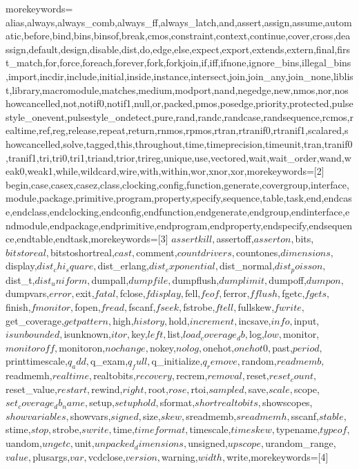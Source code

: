 {morekeywords={%
alias,always,always_comb,always_ff,always_latch,and,assert,assign,assume,automatic,before,bind,bins,binsof,break,cmos,constraint,context,continue,cover,cross,deassign,default,design,disable,dist,do,edge,else,expect,export,extends,extern,final,first_match,for,force,foreach,forever,fork,forkjoin,if,iff,ifnone,ignore_bins,illegal_bins,import,incdir,include,initial,inside,instance,intersect,join,join_any,join_none,liblist,library,macromodule,matches,medium,modport,nand,negedge,new,nmos,nor,noshowcancelled,not,notif0,notif1,null,or,packed,pmos,posedge,priority,protected,pulsestyle_onevent,pulsestyle_ondetect,pure,rand,randc,randcase,randsequence,rcmos,realtime,ref,reg,release,repeat,return,rnmos,rpmos,rtran,rtranif0,rtranif1,scalared,showcancelled,solve,tagged,this,throughout,time,timeprecision,timeunit,tran,tranif0,tranif1,tri,tri0,tri1,triand,trior,trireg,unique,use,vectored,wait,wait_order,wand,weak0,weak1,while,wildcard,wire,with,within,wor,xnor,xor},morekeywords=[2]{%
begin,case,casex,casez,class,clocking,config,function,generate,covergroup,interface,module,package,primitive,program,property,specify,sequence,table,task,end,endcase,endclass,endclocking,endconfig,endfunction,endgenerate,endgroup,endinterface,endmodule,endpackage,endprimitive,endprogram,endproperty,endspecify,endsequence,endtable,endtask},morekeywords=[3]{%
$assertkill,$assertoff,$asserton,$bits,$bitstoreal,$bitstoshortreal,$cast,$comment,$countdrivers,$countones,$dimensions,$display,$dist_chi_square,$dist_erlang,$dist_exponential,$dist_normal,$dist_poisson,$dist_t,$dist_uniform,$dumpall,$dumpfile,$dumpflush,$dumplimit,$dumpoff,$dumpon,$dumpvars,$error,$exit,$fatal,$fclose,$fdisplay,$fell,$feof,$ferror,$fflush,$fgetc,$fgets,$finish,$fmonitor,$fopen,$fread,$fscanf,$fseek,$fstrobe,$ftell,$fullskew,$fwrite,$get_coverage,$getpattern,$high,$history,$hold,$increment,$incsave,$info,$input,$isunbounded,$isunknown,$itor,$key,$left,$list,$load_coverage_db,$log,$low,$monitor,$monitoroff,$monitoron,$nochange,$nokey,$nolog,$onehot,$onehot0,$past,$period,$printtimescale,$q_add,$q_exam,$q_full,$q_initialize,$q_remove,$random,$readmemb,$readmemh,$realtime,$realtobits,$recovery,$recrem,$removal,$reset,$reset_count,$reset_value,$restart,$rewind,$right,$root,$rose,$rtoi,$sampled,$save,$scale,$scope,$set_coverage_db_name,$setup,$setuphold,$sformat,$shortrealtobits,$showscopes,$showvariables,$showvars,$signed,$size,$skew,$sreadmemb,$sreadmemh,$sscanf,$stable,$stime,$stop,$strobe,$swrite,$time,$timeformat,$timescale,$timeskew,$typename,$typeof,$uandom,$ungetc,$unit,$unpacked_dimensions,$unsigned,$upscope,$urandom_range,$value,$plusargs,$var,$vcdclose,$version,$warning,$width,$write},morekeywords=[4]{%
}}
